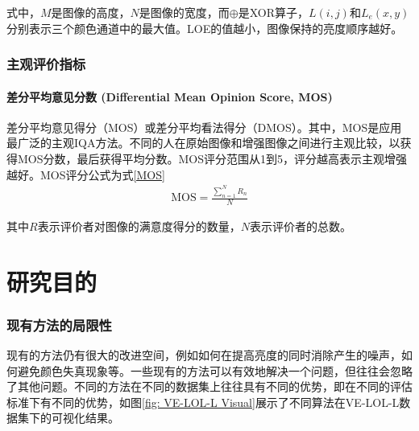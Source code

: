 \documentclass[a4paper]{ctexart}
\begin{document}
	式中，$M$是图像的高度，$N$是图像的宽度，而$\oplus$是XOR算子，$L(i, j)$和$L_{e}(x, y)$分别表示三个颜色通道中的最大值。LOE的值越小，图像保持的亮度顺序越好。
	
	\subsubsection{主观评价指标}
	
	\paragraph{差分平均意见分数 (Differential Mean Opinion Score, MOS)}
	
	差分平均意见得分（MOS）或差分平均看法得分（DMOS）。其中，MOS是应用最广泛的主观IQA方法。不同的人在原始图像和增强图像之间进行主观比较，以获得MOS分数，最后获得平均分数。MOS评分范围从1到5，评分越高表示主观增强越好。MOS评分公式为式\ref{MOS}
	\begin{equation}
		\begin{aligned}
			\text{MOS} = \frac{\sum_{n=1}^{N} R_{n}} {N}
		\end{aligned}
		\label{eq: MOS}
	\end{equation}
	
	其中$R$表示评价者对图像的满意度得分的数量，$N$表示评价者的总数。
	
	\section{研究目的}
	
	\subsubsection{现有方法的局限性}
	
	现有的方法仍有很大的改进空间，例如如何在提高亮度的同时消除产生的噪声，如何避免颜色失真现象等。一些现有的方法可以有效地解决一个问题，但往往会忽略了其他问题。不同的方法在不同的数据集上往往具有不同的优势，即在不同的评估标准下有不同的优势，如图\ref{fig: VE-LOL-L Visual}展示了不同算法在VE-LOL-L数据集下的可视化结果。
	
\end{document}
